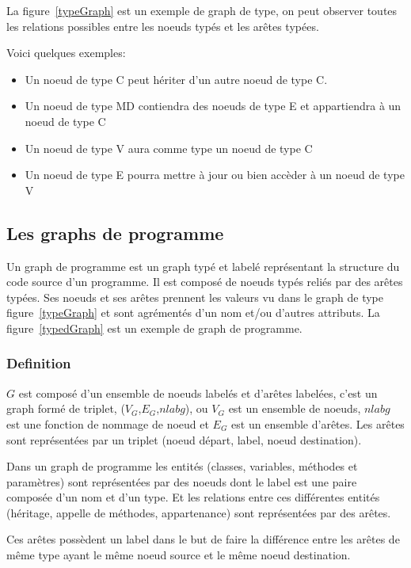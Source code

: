 \documentclass[a4paper, 12pt]{article}
\begin{document}
  La figure~\ref{typeGraph} est un exemple de graph de type, on peut observer toutes les relations possibles entre les noeuds typés et les arêtes typées.

  Voici quelques exemples:
  \begin{itemize}[label=\textbullet]
    \item Un noeud de type C peut hériter d'un autre noeud de type C.
    \item Un noeud de type MD contiendra des noeuds de type E et appartiendra à un noeud de type C
    \item Un noeud de type V aura comme type un noeud de type C
    \item Un noeud de type E pourra mettre à jour ou bien accèder à un noeud de type V
  \end{itemize}


  \subsection{Les graphs de programme}

  Un graph de programme est un graph typé et labelé représentant la structure du code source d'un programme. Il est composé de noeuds typés reliés par des arêtes typées. Ses noeuds et ses arêtes prennent les valeurs vu dans le graph de type figure~\ref{typeGraph} et sont agrémentés d'un nom et/ou d'autres attributs. La figure~\ref{typedGraph} est un exemple de graph de programme.

  \subsubsection{Definition}
  \(G \) est composé d'un ensemble de noeuds labelés et d'arêtes labelées, c'est un graph formé de triplet, ({$V_G$},{$E_G$},\(nlabg \)), ou {$V_G$} est un ensemble de noeuds,
  \(nlabg \) est une fonction de nommage de noeud et {$E_G$} est un ensemble d'arêtes. Les arêtes sont représentées par un triplet (noeud départ, label, noeud destination).

  Dans un graph de programme les entités (classes, variables, méthodes et paramètres) sont représentées par des noeuds dont le label est une paire composée d'un nom et d'un type. Et les relations entre ces différentes entités (héritage, appelle de méthodes, appartenance) sont représentées par des arêtes.

  Ces arêtes possèdent un label dans le but de faire la différence entre les arêtes de même type ayant le même noeud source et le même noeud destination.
\end{document}
